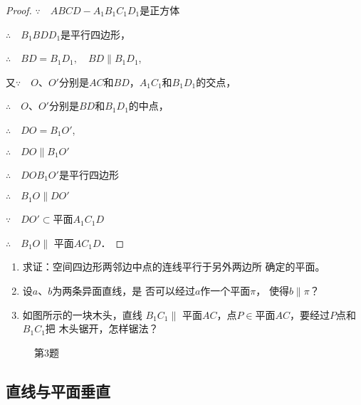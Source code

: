 \begin{proof}  
  $\because\quad ABCD-A_1B_1C_1D_1$是正方体

$\therefore\quad   B_1BDD_1$是平行四边形，

$\therefore\quad BD=B_1D_1,\quad  BD\parallel B_1D_1$,

又$\because\quad O$、$O'$分别是$AC$和$BD$，$A_1C_1$和$B_1D_1$的交点，

$\therefore\quad O$、$O'$分别是$BD$和$B_1D_1$的中点，

$\therefore\quad DO=B_1O'$,

$\therefore\quad   DO\parallel B_1O'$

$\therefore\quad   DOB_1O'$是平行四边形

$\therefore\quad   B_1O\parallel DO'$

$\because\quad DO'\subset$平面$A_1C_1D$

$\therefore\quad  B_1O\parallel$ 平面$AC_1D$．
\end{proof}

\begin{ex}
\begin{enumerate}
  \item 求证：空间四边形两邻边中点的连线平行于另外两边所
  确定的平面。
  \item 设$a$、$b$为两条异面直线，是
  否可以经过$a$作一个平面$\pi$，
  使得$b\parallel \pi$？
  \item 如图所示的一块木头，直线
  $B_1C_1\parallel$ 平面$AC$，点$P\in$平面$AC$，要经过$P$点和$B_1C_1$把
  木头锯开，怎样锯法？
\end{enumerate}
\end{ex}

\begin{figure}[htp]
  \centering
{}
  \caption*{第3题}
\end{figure}

\subsection{直线与平面垂直}


